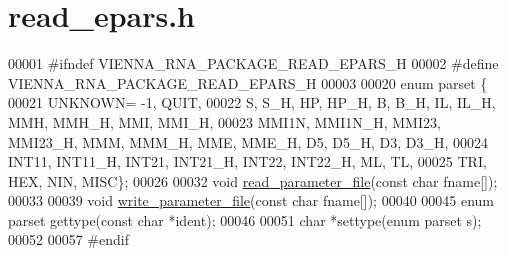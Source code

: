 \hypertarget{read__epars_8h_source}{}\section{read\+\_\+epars.\+h}
\label{read__epars_8h_source}

\begin{DoxyCode}
00001 \textcolor{preprocessor}{#ifndef VIENNA\_RNA\_PACKAGE\_READ\_EPARS\_H}
00002 \textcolor{preprocessor}{#define VIENNA\_RNA\_PACKAGE\_READ\_EPARS\_H}
00003 
00020 \textcolor{keyword}{enum} parset \{
00021   UNKNOWN= -1, QUIT,
00022   S, S\_H, HP, HP\_H, B, B\_H, IL, IL\_H, MMH, MMH\_H, MMI, MMI\_H,
00023   MMI1N, MMI1N\_H, MMI23, MMI23\_H, MMM, MMM\_H, MME, MME\_H, D5, D5\_H, D3, D3\_H,
00024   INT11, INT11\_H, INT21, INT21\_H, INT22, INT22\_H, ML, TL,
00025   TRI, HEX, NIN, MISC\};
00026 
00032 \textcolor{keywordtype}{void}  \hyperlink{group__energy__parameters__rw_ga165a142a3c68fb6655c69ef4ab7cd749}{read\_parameter\_file}(\textcolor{keyword}{const} \textcolor{keywordtype}{char} fname[]);
00033 
00039 \textcolor{keywordtype}{void}  \hyperlink{group__energy__parameters__rw_ga8a43459be386a7489feeab68dc2c6c76}{write\_parameter\_file}(\textcolor{keyword}{const} \textcolor{keywordtype}{char} fname[]);
00040 
00045 \textcolor{keyword}{enum}  parset gettype(\textcolor{keyword}{const} \textcolor{keywordtype}{char} *ident);
00046 
00051 \textcolor{keywordtype}{char}  *settype(\textcolor{keyword}{enum} parset s);
00052 
00057 \textcolor{preprocessor}{#endif}
\end{DoxyCode}
